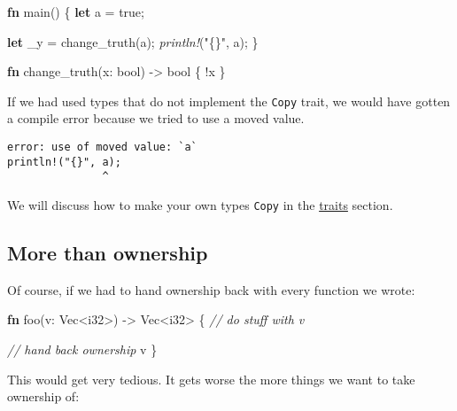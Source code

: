 \documentclass[a4paper,]{book}
\newenvironment{Shaded}{\begin{snugshade}}{\end{snugshade}}
\newcommand{\KeywordTok}[1]{\textcolor[rgb]{0.13,0.29,0.53}{\textbf{{#1}}}}
\newcommand{\DataTypeTok}[1]{\textcolor[rgb]{0.13,0.29,0.53}{{#1}}}
\newcommand{\ConstantTok}[1]{\textcolor[rgb]{0.00,0.00,0.00}{{#1}}}
\newcommand{\StringTok}[1]{\textcolor[rgb]{0.31,0.60,0.02}{{#1}}}
\newcommand{\CommentTok}[1]{\textcolor[rgb]{0.56,0.35,0.01}{\textit{{#1}}}}
\newcommand{\PreprocessorTok}[1]{\textcolor[rgb]{0.56,0.35,0.01}{\textit{{#1}}}}
\newcommand{\NormalTok}[1]{{#1}}
\begin{document}
\begin{Shaded}
\begin{Highlighting}[]
\KeywordTok{fn} \NormalTok{main() \{}
    \KeywordTok{let} \NormalTok{a = }\ConstantTok{true}\NormalTok{;}

    \KeywordTok{let} \NormalTok{_y = change_truth(a);}
    \PreprocessorTok{println!}\NormalTok{(}\StringTok{"\{\}"}\NormalTok{, a);}
\NormalTok{\}}

\KeywordTok{fn} \NormalTok{change_truth(x: }\DataTypeTok{bool}\NormalTok{) -> }\DataTypeTok{bool} \NormalTok{\{}
    \NormalTok{!x}
\NormalTok{\}}
\end{Highlighting}
\end{Shaded}

If we had used types that do not implement the \texttt{Copy} trait, we
would have gotten a compile error because we tried to use a moved value.

\begin{verbatim}
error: use of moved value: `a`
println!("{}", a);
               ^
\end{verbatim}

We will discuss how to make your own types \texttt{Copy} in the
\protect\hyperlink{sec--traits}{traits} section.

\subsection{More than ownership}\label{more-than-ownership}

Of course, if we had to hand ownership back with every function we
wrote:

\begin{Shaded}
\begin{Highlighting}[]
\KeywordTok{fn} \NormalTok{foo(v: }\DataTypeTok{Vec}\NormalTok{<}\DataTypeTok{i32}\NormalTok{>) -> }\DataTypeTok{Vec}\NormalTok{<}\DataTypeTok{i32}\NormalTok{> \{}
    \CommentTok{// do stuff with v}

    \CommentTok{// hand back ownership}
    \NormalTok{v}
\NormalTok{\}}
\end{Highlighting}
\end{Shaded}

This would get very tedious. It gets worse the more things we want to
take ownership of:
\end{document}
